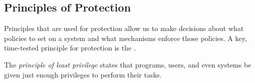 \subsection{Principles of Protection}\label{subsec:Protection_Principles}
Principles that are used for protection allow us to make decisions about what policies to set on a system and what mechanisms enforce those policies.
A key, time-tested principle for protection is the .

\begin{definition}\label{def:Principle_Least_Privilege}
  The \emph{principle of least privilege} states that programs, users, and even systems be given just enough privileges to perform their tasks.
\end{definition}


